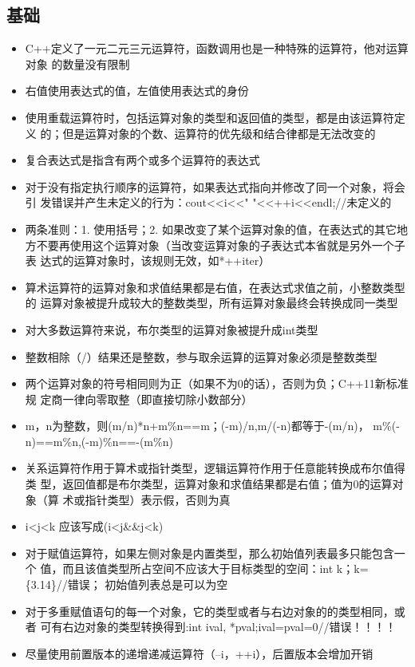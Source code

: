 \documentclass[11pt]{article}
\begin{document}
\subsection{基础}
\label{sec-2-1}
\begin{itemize}
\item C++定义了一元二元三元运算符，函数调用也是一种特殊的运算符，他对运算对象
的数量没有限制
\item 右值使用表达式的值，左值使用表达式的身份
\item 使用重载运算符时，包括运算对象的类型和返回值的类型，都是由该运算符定义
的；但是运算对象的个数、运算符的优先级和结合律都是无法改变的
\item 复合表达式是指含有两个或多个运算符的表达式
\item 对于没有指定执行顺序的运算符，如果表达式指向并修改了同一个对象，将会引
发错误并产生未定义的行为：cout<<i<<" "<<++i<<endl;//未定义的
\item 两条准则：1. 使用括号；2. 如果改变了某个运算对象的值，在表达式的其它地
方不要再使用这个运算对象（当改变运算对象的子表达式本省就是另外一个子表
达式的运算对象时，该规则无效，如*++iter）
\item 算术运算符的运算对象和求值结果都是右值，在表达式求值之前，小整数类型的
运算对象被提升成较大的整数类型，所有运算对象最终会转换成同一类型
\item 对大多数运算符来说，布尔类型的运算对象被提升成int类型
\item 整数相除（/）结果还是整数，参与取余运算的运算对象必须是整数类型
\item 两个运算对象的符号相同则为正（如果不为0的话），否则为负；C++11新标准规
定商一律向零取整（即直接切除小数部分）
\item m，n为整数，则(m/n)*n+m\%n==m；(-m)/n,m/(-n)都等于-(m/n)，
m\%(-n)==m\%n,(-m)\%n==-(m\%n)
\item 关系运算符作用于算术或指针类型，逻辑运算符作用于任意能转换成布尔值得类
型，返回值都是布尔类型，运算对象和求值结果都是右值；值为0的运算对象（算
术或指针类型）表示假，否则为真
\item i<j<k 应该写成(i<j\&\&j<k)
\item 对于赋值运算符，如果左侧对象是内置类型，那么初始值列表最多只能包含一个
值，而且该值类型所占空间不应该大于目标类型的空间：int k；k=\{3.14\}//错误；
初始值列表总是可以为空
\item 对于多重赋值语句的每一个对象，它的类型或者与右边对象的的类型相同，或者
可有右边对象的类型转换得到:int ival, *pval;ival=pval=0//错误！！！！
\item 尽量使用前置版本的递增递减运算符（--i，++i），后置版本会增加开销

\end{itemize}
\end{document}
